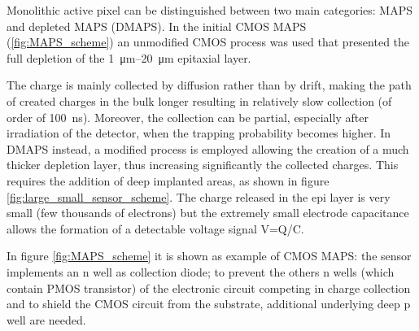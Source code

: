   Monolithic active pixel can be distinguished between two main categories: MAPS and depleted MAPS (DMAPS).
   In the initial CMOS MAPS (\ref{fig:MAPS_scheme}) an unmodified CMOS process was used that presented the full depletion of the \SIrange{1}{20}{\um} epitaxial layer.

   The charge is mainly collected by diffusion rather than by drift, making the path of created charges in the bulk longer resulting in relatively slow collection (of order of \SI{100}{ns}). 
   Moreover, the collection can be partial, especially after irradiation of the detector, when the trapping probability becomes higher. 
   In DMAPS instead, a modified process is employed allowing the creation of a much thicker depletion layer, thus increasing significantly the collected charges. This requires the addition of deep implanted areas, as shown in figure \ref{fig:large_small_sensor_scheme}. The charge released in the epi layer is very small (few thousands of electrons) but the extremely small electrode capacitance allows the formation of a detectable voltage signal V=Q/C.
   
   In figure \ref{fig:MAPS_scheme} it is shown as example of CMOS MAPS: the sensor implements an n well as collection diode; to prevent the others n wells (which contain PMOS transistor) of the electronic circuit competing in charge collection and to shield the CMOS circuit from the substrate, additional underlying deep p well are needed.
   

